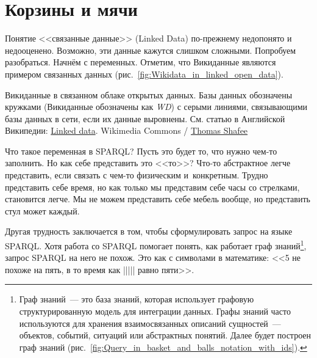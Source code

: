 \chapter{Корзины и мячи}
\label{ch:BucketsAndBalls}

Понятие <<связанные данные>> (Linked Data) по-прежнему недопонято и недооценено. 
Возможно, эти данные кажутся слишком сложными. 
Попробуем разобраться. Начнём с переменных. 
Отметим, что Викиданные являются примером связанных данных (рис.~\ref{fig:Wikidata_in_linked_open_data}).

\begin{marginfigure}[-5\baselineskip]
	{
		\setlength{\fboxsep}{0pt}%
		\setlength{\fboxrule}{1pt}%
	}
    \caption[Викиданные в связанном облаке открытых данных.]{Викиданные в связанном облаке открытых данных. Базы данных обозначены кружками (Викиданные обозначены как \textit{WD}) с серыми линиями, связывающими базы данных в сети, если их данные выровнены. См. статью в Английской Википедии: \href{https://en.wikipedia.org/wiki/Linked_data}{Linked data}. Wikimedia Commons / \href{https://commons.wikimedia.org/wiki/File:Wikidata_in_the_Linked_Open_Data_cloud_2020-08-20.svg}{Thomas Shafee}}
	\label{fig:Wikidata_in_linked_open_data}
\end{marginfigure}

Что такое переменная в SPARQL? Пусть это будет то, что нужно чем-то заполнить. 
Но как себе представить это <<то>>? Что-то абстрактное легче представить, 
если связать с чем-то физическим и~конкретным. 
Трудно представить себе время, но как только мы представим себе часы со стрелками, становится легче. Мы не можем представить себе мебель вообще, но представить стул может каждый.

Другая трудность заключается в том, 
чтобы сформулировать запрос на языке SPARQL. 
Хотя работа со SPARQL помогает понять, как работает граф знаний\footnote[][12pt]{%
%
%
Граф знаний~--- это база знаний, которая использует графовую структурированную модель для интеграции данных. 
Графы знаний часто используются для хранения взаимосвязанных описаний сущностей~--- объектов, 
событий, ситуаций или абстрактных понятий. 
Далее будет построен граф знаний (рис.~\ref{fig:Query_in_basket_and_balls_notation_with_ids}).%
}, 
запрос SPARQL на него не похож. Это как с символами в математике: <<5 не похоже на пять, в то время как ||||| равно пяти>>.

